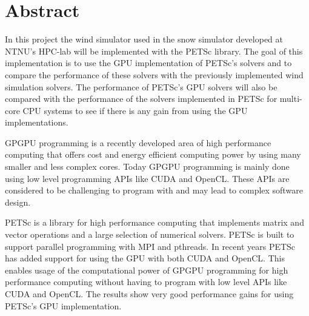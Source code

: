 \section*{Abstract}

In this project the wind simulator used in the snow simulator developed at
NTNU's HPC-lab will be implemented with the PETSc library. The goal of this
implementation is to use the GPU implementation of PETSc's solvers and to
compare the performance of these solvers with the previously implemented wind
simulation solvers. The performance of PETSc's GPU solvers will also be compared
with the performance of the solvers implemented in PETSc for multi-core CPU
systems to see if there is any gain from using the GPU implementations.

GPGPU programming is a recently developed area of high performance computing that
offers cost and energy efficient computing power by using many smaller and less
complex cores. Today GPGPU programming is mainly done using low level programming
APIs like CUDA and OpenCL. These APIs are considered to be challenging to
program with and may lead to complex software design.

PETSc is a library for high performance computing that implements matrix and vector
operations and a large selection of numerical solvers. PETSc is built to support
parallel programming with MPI and pthreads. In recent years PETSc has added
support for using the GPU with both CUDA and OpenCL. This enables usage of the
computational power of GPGPU programming for high performance
computing without having to program with low level APIs like CUDA and OpenCL.
The results show very good performance gains for using PETSc's GPU implementation.
